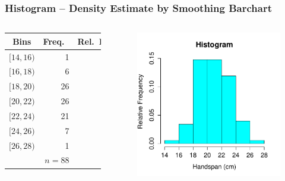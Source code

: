 \documentclass[handout]{beamer}
\begin{document}
\begin{frame}
\frametitle{Histogram -- Density Estimate by Smoothing Barchart}
\footnotesize
\singlespacing

\begin{columns}
\begin{tabular}{crr}
Bins & Freq.\ & Rel.\ Freq.\ \\
\hline
 $[14,16)$&1& 0.01\\
 $[16,18)$&6& 0.07\\
 $[18,20)$&26&0.30 \\
 $[20,22)$&26&0.30 \\
 $[22,24)$&21&0.24 \\
 $[24,26)$&7&0.08 \\
 $[26,28)$&1&0.01\\
 \hline
 & $n=88$&1.00
\end{tabular}
\begin{figure}
	\centering
	\includegraphics[scale = 0.5]{./images/handspan_truehist}
\end{figure}
\end{columns}
\end{frame}
\end{document}
